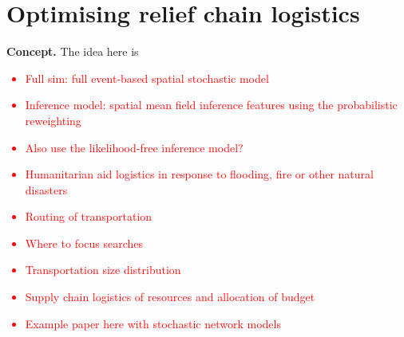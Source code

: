 \chapter{\sffamily Optimising relief chain logistics}

{\bfseries\sffamily Concept.} The idea here is 

\textcolor{red}{
\begin{itemize}
\item{Full sim: full event-based spatial stochastic model}
\item{Inference model: spatial mean field inference features using the probabilistic reweighting }
\item{Also use the likelihood-free inference model?}
\end{itemize}
}

\textcolor{red}{
\begin{itemize}
\item{Humanitarian aid logistics in response to flooding, fire or other natural disasters}
\item{Routing of transportation}
\item{Where to focus searches}
\item{Transportation size distribution}
\item{Supply chain logistics of resources and allocation of budget}
\item{Example paper here with stochastic network models~\cite{alem2016stochastic}}
\end{itemize}
}